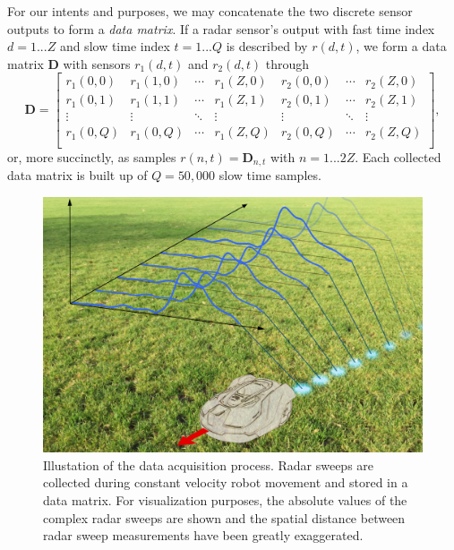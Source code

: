 
For our intents and purposes, we may concatenate the two discrete sensor outputs to form a \emph{data matrix}. If a radar sensor's output with fast time index $d=1...Z$ and slow time index $t=1...Q$ is described by $r(d,t)$, we form a data matrix $\mathbf{D}$ with sensors $r_1(d,t)$ and $r_2(d,t)$ through
\begin{equation}
	\mathbf{D}= 
	\begin{bmatrix}
		r_1(0,0) & r_1(1,0) & \cdots & r_1(Z,0) & r_2(0,0) & \cdots & r_2(Z,0) \\
		r_1(0,1) & r_1(1,1) & \cdots & r_1(Z,1) & r_2(0,1) & \cdots & r_2(Z,1) \\
		\vdots &  \vdots & \ddots & \vdots & \vdots & \ddots &  \vdots \\
		r_1(0,Q) & r_1(0,Q) & \cdots  & r_1(Z,Q) & r_2(0,Q) & \cdots  & r_2(Z,Q) \\
	\end{bmatrix}
	,
\end{equation}
or, more succinctly, as samples $r(n,t) = \mathbf{D}_{n,t}$ with $n=1...2Z$. Each collected data matrix is built up of $Q=50,000$ slow time samples.

\begin{figure}
	\centering
	\includegraphics[scale=0.60]{figs_temp/data_collecting.jpg}
	\caption{Illustation of the data acquisition process. Radar sweeps are collected during constant velocity robot movement and stored in a data matrix. For visualization purposes, the absolute values of the complex radar sweeps are shown and the spatial distance between radar sweep measurements have been greatly exaggerated.}
	\label{fig:data_collecting}
\end{figure}

